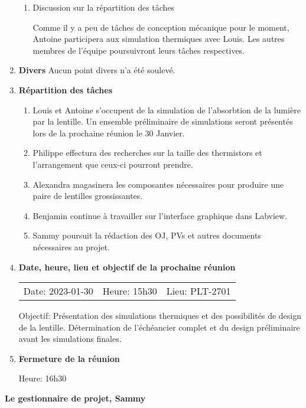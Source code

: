\documentclass[12pt]{ULojpv}
\begin{document}
\begin{enumerate}
\begin{enumerate}
      \item Discussion sur la répartition des tâches
      
      Comme il y a peu de tâches de conception mécanique pour le moment, Antoine participera aux simulation thermiques avec Louis.
      Les autres membres de l'équipe poursuivront leurs tâches respectives.
      
      
   \end{enumerate}

\item \textbf{Divers}
   Aucun point divers n'a été soulevé.

\item \textbf{Répartition des tâches}
   \begin{enumerate}
      \item Louis et Antoine s'occupent de la simulation de l'absorbtion de la lumière par la lentille. Un ensemble préliminaire
      de simulations seront présentés lors de la prochaine réunion le 30 Janvier.

      \item Philippe effectura des recherches sur la taille des thermistors et l'arrangement que ceux-ci pourront prendre.
      
      \item Alexandra magasinera les composantes nécessaires pour produire une paire de lentilles grossissantes.

      \item  Benjamin continue à travailler sur l'interface graphique dans Labview.

      \item Sammy poursuit la rédaction des OJ, PVs et autres documents nécessaires au projet.
   \end{enumerate}



\item \textbf{Date, heure, lieu et objectif de la prochaine réunion}

\begin{tabular}{@{}lll}
   Date: 2023-01-30
   & Heure: 15h30
   &  Lieu: PLT-2701
\end{tabular}
\par

Objectif: Présentation des simulations thermiques et des possibilités de design de la lentille. Détermination de l'échéancier complet 
et du design préliminaire avant les simulations finales. 


\item \textbf{Fermeture de la réunion}

Heure: 16h30




\end{enumerate}

\begin{flushright}
   \textbf{Le gestionnaire de projet, Sammy}

\end{flushright}
\end{document}
